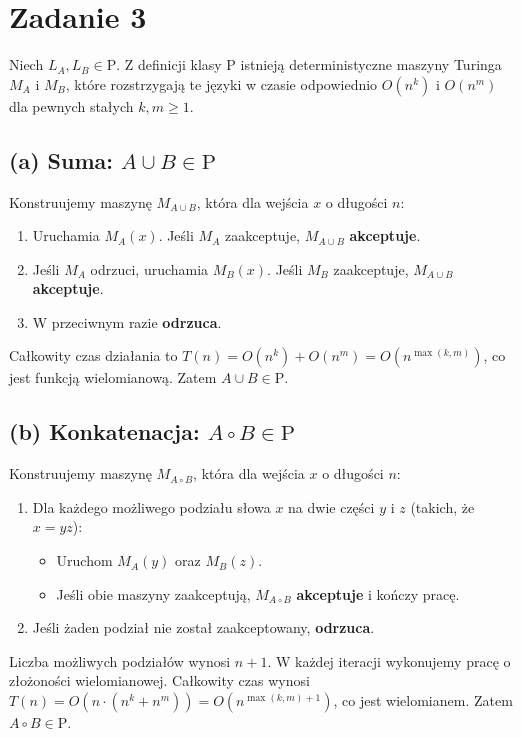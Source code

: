 \documentclass{article}
\begin{document}
\section{Zadanie 3}

Niech $L_A, L_B \in \text{P}$. Z definicji klasy P istnieją deterministyczne maszyny Turinga $M_A$ i $M_B$, które rozstrzygają te języki w czasie odpowiednio $O(n^k)$ i $O(n^m)$ dla pewnych stałych $k, m \geq 1$.

\subsection*{(a) Suma: $A \cup B \in \text{P}$}

Konstruujemy maszynę $M_{A \cup B}$, która dla wejścia $x$ o długości $n$:
\begin{enumerate}
    \item Uruchamia $M_A(x)$. Jeśli $M_A$ zaakceptuje, $M_{A \cup B}$ \textbf{akceptuje}.
    \item Jeśli $M_A$ odrzuci, uruchamia $M_B(x)$. Jeśli $M_B$ zaakceptuje, $M_{A \cup B}$ \textbf{akceptuje}.
    \item W przeciwnym razie \textbf{odrzuca}.
\end{enumerate}
Całkowity czas działania to $T(n) = O(n^k) + O(n^m) = O(n^{\max(k,m)})$, co jest funkcją wielomianową. Zatem $A \cup B \in \text{P}$.


\subsection*{(b) Konkatenacja: $A \circ B \in \text{P}$}

Konstruujemy maszynę $M_{A \circ B}$, która dla wejścia $x$ o długości $n$:
\begin{enumerate}
    \item Dla każdego możliwego podziału słowa $x$ na dwie części $y$ i $z$ (takich, że $x = yz$):
    \begin{itemize}
        \item Uruchom $M_A(y)$ oraz $M_B(z)$.
        \item Jeśli obie maszyny zaakceptują, $M_{A \circ B}$ \textbf{akceptuje} i kończy pracę.
    \end{itemize}
    \item Jeśli żaden podział nie został zaakceptowany, \textbf{odrzuca}.
\end{enumerate}
Liczba możliwych podziałów wynosi $n+1$. W każdej iteracji wykonujemy pracę o złożoności wielomianowej. Całkowity czas wynosi $T(n) = O(n \cdot (n^k + n^m)) = O(n^{\max(k,m)+1})$, co jest wielomianem. Zatem $A \circ B \in \text{P}$.
\end{document}
